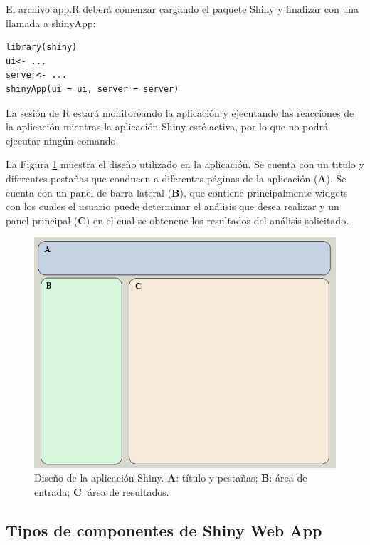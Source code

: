 El archivo app.R deberá comenzar cargando el paquete Shiny y finalizar con una llamada a shinyApp:\\

\begin{lstlisting}[frame=single]
library(shiny)
ui<- ...
server<- ...
shinyApp(ui = ui, server = server)
\end{lstlisting}

La sesión de R estará monitoreando la aplicación y ejecutando las reacciones de la aplicación mientras la aplicación Shiny esté activa, por lo que no podrá ejecutar ningún comando.

La Figura \ref{fig:fig33} muestra el diseño utilizado en la aplicación. Se cuenta con un titulo y diferentes pestañas que conducen a diferentes páginas de la aplicación (\textbf{A}). Se cuenta con un panel de barra lateral (\textbf{B}), que contiene principalmente widgets con los cuales el usuario puede determinar el análisis que desea realizar y un panel principal (\textbf{C}) en el cual se obtenene los resultados del análisis solicitado.

\begin{figure}[h]
\begin{center}
\includegraphics[width=12cm]{./Graficos/figura6}
\end{center}
\caption{Diseño de la aplicación Shiny. \textbf{A}: título y pestañas; \textbf{B}: área de entrada; \textbf{C}: área de resultados.}
\label{fig:fig33}
\end{figure}

\subsection{Tipos de componentes de Shiny Web App}


